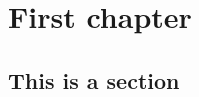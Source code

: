 \documentclass[b5paper,10pt,twoside]{book}
\begin{document}
%



{
\tableofcontents
}
{
\chapter{First chapter}
\section{This is a section}
}

{
}
\end{document}
